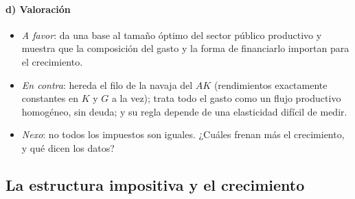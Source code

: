 \documentclass[11pt]{article}
\begin{document}
\paragraph{d) Valoración}

\begin{itemize}
\item \emph{A favor}: da una base al tamaño óptimo del sector público productivo y muestra que la composición del gasto y la forma de financiarlo importan para el crecimiento.
\item \emph{En contra}: hereda el filo de la navaja del $AK$ (rendimientos exactamente constantes en $K$ y $G$ a la vez); trata todo el gasto como un flujo productivo homogéneo, sin deuda; y su regla depende de una elasticidad difícil de medir.
\item \emph{Nexo}: no todos los impuestos son iguales. ¿Cuáles frenan más el crecimiento, y qué dicen los datos?
\end{itemize}

\subsection{La estructura impositiva y el crecimiento}\label{sec:impuestos-crecimiento}
\end{document}
